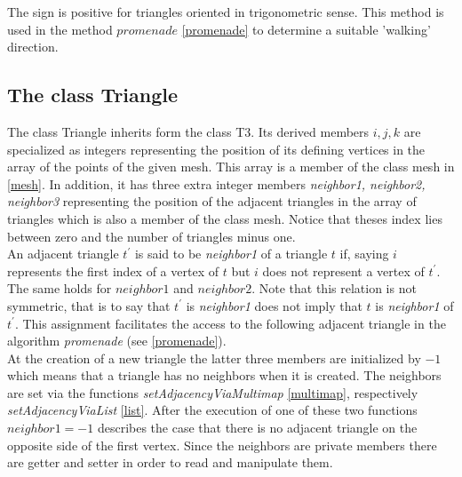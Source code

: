 \documentclass[10pt]{article}
\begin{document}
The sign is positive for triangles oriented in trigonometric sense. This method is used in the method $promenade$ \ref{promenade} to determine a suitable 'walking' direction.


\subsection{The class Triangle} \label{triangle}
The class Triangle inherits form the class T3. Its derived members $ i,j,k $ are specialized as integers representing the position of its defining vertices in the array of the points of the given mesh. This array is a member of the class mesh in \ref{mesh}. In addition, it has three extra integer members {\itshape neighbor1, neighbor2, neighbor3} representing the position of the adjacent triangles in the array of triangles which is also a member of the class mesh. Notice that theses index lies between zero and the number of triangles minus one. \\
 An adjacent triangle $ t^{'} $ is said to be  {\itshape neighbor1 } of a triangle $ t $ if, saying $ i $ represents the first index of a vertex of $t$ but $i$ does not represent a vertex of $ t^{'} $. The same holds for $ neighbor1 $ and $ neighbor2 $. Note that this relation is not symmetric, that is to say that $ t^{'} $ is {\itshape neighbor1} does not imply that $t$ is {\itshape neighbor1} of $t^{'}$. 
This assignment facilitates the access to the following adjacent triangle in the algorithm {\itshape promenade} (see \ref{promenade}).  \\
At the creation of a new triangle the latter three members are initialized by $ -1 $ which means that a triangle has no neighbors when it is created. The neighbors are set via the functions {\itshape setAdjacencyViaMultimap} \ref{multimap}, respectively {\itshape setAdjacencyViaList} \ref{list}. After the execution of one of these two functions $neighbor1 =  -1 $ describes the case that there is no adjacent triangle on the opposite side of the first vertex. 
Since the neighbors are private members there are getter and setter in order to read and manipulate them. \\
\end{document}
